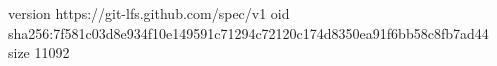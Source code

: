 version https://git-lfs.github.com/spec/v1
oid sha256:7f581c03d8e934f10e149591c71294c72120c174d8350ea91f6bb58c8fb7ad44
size 11092
